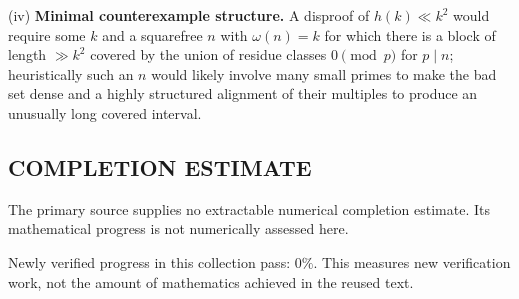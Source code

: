 (iv) \textbf{Minimal counterexample structure.} A disproof of $h(k)\ll k^2$ would require some $k$ and a squarefree $n$ with $\omega(n)=k$ for which there is a block of length $\gg k^2$ covered by the union of residue classes $0\pmod p$ for $p\mid n$; heuristically such an $n$ would likely involve many small primes to make the bad set dense and a highly structured alignment of their multiples to produce an unusually long covered interval.




\subsection*{COMPLETION ESTIMATE}
The primary source supplies no extractable numerical completion estimate. Its mathematical progress is not numerically assessed here.

Newly verified progress in this collection pass: $0\%$. This measures new verification work, not the amount of mathematics achieved in the reused text.
